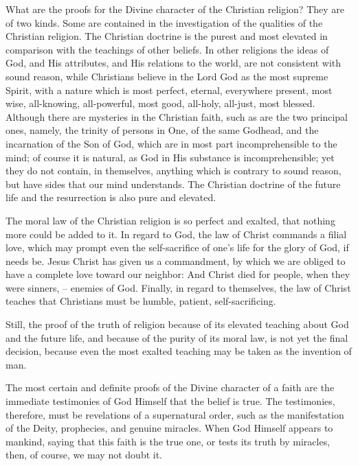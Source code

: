 What are the proofs for the Divine character of the Christian religion? They are of two kinds. Some are contained in the investigation of the qualities of the Christian religion. The Christian doctrine is the purest and most elevated in comparison with the teachings of other beliefs. In other religions the ideas of God, and His attributes, and His relations to the world, are not consistent with sound reason, while Christians believe in the Lord God as the most supreme Spirit, with a nature which is most perfect, eternal, everywhere present, most wise, all-knowing, all-powerful, most good, all-holy, all-just, most blessed. Although there are mysteries in the Christian faith, such as are the two principal ones, namely, the trinity of persons in One, of the same Godhead, and the incarnation of the Son of God, which are in most part incomprehensible to the mind; of course it is natural, as God in His substance is incomprehensible; yet they do not contain, in themselves, anything which is contrary to sound reason, but have sides that our mind understands. The Christian doctrine of the future life and the resurrection is also pure and elevated.

The moral law of the Christian religion is so perfect and exalted, that nothing more could be added to it. In regard to God, the law of Christ commands a filial love, which may prompt even the self-sacrifice of one's life for the glory of God, if needs be. Jesus Christ has given us a commandment, by which we are obliged to have a complete love toward our neighbor:   And Christ died for people, when they were sinners, -- enemies of God. Finally, in regard to themselves, the law of Christ teaches that Christians must be humble, patient, self-sacrificing.

Still, the proof of the truth of religion because of its elevated teaching about God and the future life, and because of the purity of its moral law, is not yet the final decision, because even the most exalted teaching may be taken as the invention of man.

The most certain and definite proofs of the Divine character of a faith are the immediate testimonies of God Himself that the belief is true. The testimonies, therefore, must be revelations of a supernatural order, such as the manifestation of the Deity, prophecies, and genuine miracles. When God Himself appears to mankind, saying that this faith is the true one, or tests its truth by miracles, then, of course, we may not doubt it.

